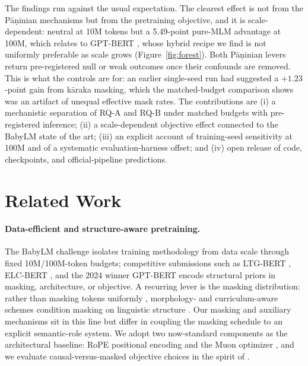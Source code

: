 \documentclass[11pt]{article}
\begin{document}
The findings run against the usual expectation. The clearest effect is not from the P\=a\d{n}inian mechanisms but from the pretraining objective, and it is scale-dependent: neutral at 10M tokens but a 5.49-point pure-MLM advantage at 100M, which relates to GPT-BERT \cite{CharpentierSamuel2024}, whose hybrid recipe we find is not uniformly preferable as scale grows (Figure~\ref{fig:forest}). Both P\=a\d{n}inian levers return pre-registered null or weak outcomes once their confounds are removed. This is what the controls are for: an earlier single-seed run had suggested a $+1.23$-point gain from k\=araka masking, which the matched-budget comparison shows was an artifact of unequal effective mask rates. The contributions are (i) a mechanistic separation of RQ-A and RQ-B under matched budgets with pre-registered inference; (ii) a scale-dependent objective effect connected to the BabyLM state of the art; (iii) an explicit account of training-seed sensitivity at 100M and of a systematic evaluation-harness offset; and (iv) open release of code, checkpoints, and official-pipeline predictions.

\section{Related Work}
\label{sec:related}
\paragraph{Data-efficient and structure-aware pretraining.}
The BabyLM challenge \cite{Warstadt2023,Hu2024BabyLM} isolates training methodology from data scale through fixed 10M/100M-token budgets; competitive submissions such as LTG-BERT \cite{Samuel2023LTG}, ELC-BERT \cite{CharpentierSamuel2023}, and the 2024 winner GPT-BERT \cite{CharpentierSamuel2024} encode structural priors in masking, architecture, or objective. A recurring lever is the masking distribution: rather than masking tokens uniformly \cite{Devlin2019}, morphology- and curriculum-aware schemes condition masking on linguistic structure \cite{Xu2020Curriculum,Belinkov2017Morphology,Botha2014Morphology}. Our masking and auxiliary mechanisms sit in this line but differ in coupling the masking schedule to an explicit semantic-role system. We adopt two now-standard components as the architectural baseline: RoPE positional encoding \cite{Su2021RoPE} and the Muon optimizer \cite{Jordan2024Muon}, and we evaluate causal-versus-masked objective choices in the spirit of \citet{CharpentierSamuel2024}.
\end{document}

